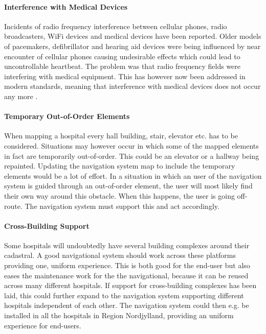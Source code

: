 \paragraph{Interference with Medical Devices}

Incidents of radio frequency interference between cellular phones, radio broadcasters, WiFi devices and medical devices have been reported. Older models of pacemakers, defibrillator and hearing aid devices were being influenced by near encounter of cellular phones causing undesirable effects which could lead to uncontrollable heartbeat. 
The problem was that radio frequency fields were interfering with medical equipment. This has however now been addressed in modern standards, meaning that interference with medical devices does not occur any more \cite{Man1998,Case}.

\paragraph{Temporary Out-of-Order Elements}

When mapping a hospital every hall building, stair, elevator etc. has to be considered. Situations may however occur in which some of the mapped elements in fact are temporarily out-of-order. This could be an elevator or a hallway being repainted. Updating the navigation system map to include the temporary elements would be a lot of effort. In a situation in which an user of the navigation system is guided through an out-of-order element, the user will most likely find their own way around this obstacle. When this happens, the user is going off-route. The navigation system must support this and act accordingly.

\paragraph{Cross-Building Support}

Some hospitals will undoubtedly have several building complexes around their cadastral. A good navigational system should work across these platforms providing one, uniform experience. This is both good for the end-user but also eases the maintenance work for the the navigational, because it can be reused across many different hospitals. If support for cross-building complexes has been laid, this could further expand to the navigation system supporting different hospitals independent of each other. The navigation system could then e.g. be installed in all the hospitals in Region Nordjylland, providing an uniform experience for end-users.

